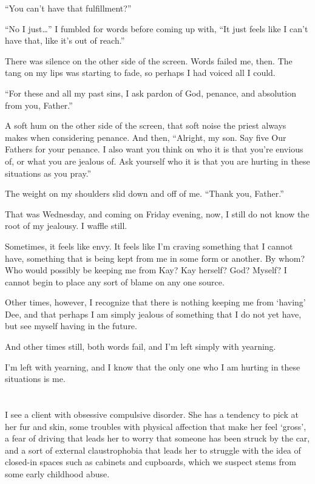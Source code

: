 ``You can't have that fulfillment?''

``No I just\ldots{}'' I fumbled for words before coming up with, ``It just feels like I can't have that, like it's out of reach.''

There was silence on the other side of the screen. Words failed me, then. The tang on my lips was starting to fade, so perhaps I had voiced all I could.

``For these and all my past sins, I ask pardon of God, penance, and absolution from you, Father.''

A soft hum on the other side of the screen, that soft noise the priest always makes when considering penance. And then, ``Alright, my son. Say five Our Fathers for your penance. I also want you think on who it is that you're envious of, or what you are jealous of. Ask yourself who it is that you are hurting in these situations as you pray.''

The weight on my shoulders slid down and off of me. ``Thank you, Father.''

That was Wednesday, and coming on Friday evening, now, I still do not know the root of my jealousy. I waffle still.

Sometimes, it feels like envy. It feels like I'm craving something that I cannot have, something that is being kept from me in some form or another. By whom? Who would possibly be keeping me from Kay? Kay herself? God? Myself? I cannot begin to place any sort of blame on any one source.

Other times, however, I recognize that there is nothing keeping me from `having' Dee, and that perhaps I am simply jealous of something that I do not yet have, but see myself having in the future.

And other times still, both words fail, and I'm left simply with yearning.

I'm left with yearning, and I know that the only one who I am hurting in these situations is me.

\section{}

I see a client with obsessive compulsive disorder. She has a tendency to pick at her fur and skin, some troubles with physical affection that make her feel `gross', a fear of driving that leads her to worry that someone has been struck by the car, and a sort of external claustrophobia that leads her to struggle with the idea of closed-in spaces such as cabinets and cupboards, which we suspect stems from some early childhood abuse.

